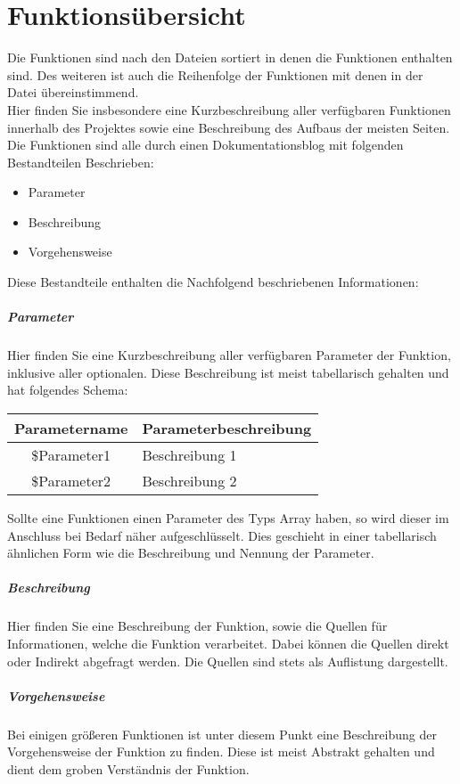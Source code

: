 \setcounter{secnumdepth}{3}
\chapter{Funktionsübersicht}
Die Funktionen sind nach den Dateien sortiert in denen die Funktionen enthalten sind. Des weiteren ist auch die Reihenfolge der Funktionen mit denen in der Datei übereinstimmend. \\
Hier finden Sie insbesondere eine Kurzbeschreibung aller verfügbaren Funktionen innerhalb des Projektes sowie eine Beschreibung des Aufbaus der meisten Seiten. Die Funktionen sind alle durch einen Dokumentationsblog mit folgenden Bestandteilen Beschrieben:
\begin{itemize}
	\item Parameter
	\item Beschreibung
	\item Vorgehensweise
\end{itemize}
Diese Bestandteile enthalten die Nachfolgend beschriebenen Informationen:
\paragraph{Parameter} Hier finden Sie eine Kurzbeschreibung aller verfügbaren Parameter der Funktion, inklusive aller optionalen. Diese Beschreibung ist meist tabellarisch gehalten und hat folgendes Schema:
\begin{table}[H]
	\begin{tabular}{|c|p{11cm}|}
		\hline
		\textbf{Parametername} & \textbf{Parameterbeschreibung} \\ \hline
		\$Parameter1 & Beschreibung 1 \\ \hline
		\$Parameter2 & Beschreibung 2 \\ \hline
	\end{tabular}
\end{table}
Sollte eine Funktionen einen Parameter des Typs Array haben, so wird dieser im Anschluss bei Bedarf näher aufgeschlüsselt. Dies geschieht in einer tabellarisch ähnlichen Form wie die Beschreibung und Nennung der Parameter.
\paragraph{Beschreibung} Hier finden Sie eine Beschreibung der Funktion, sowie die Quellen für Informationen, welche die Funktion verarbeitet. Dabei können die Quellen direkt oder Indirekt abgefragt werden. Die Quellen sind stets als Auflistung dargestellt.
\paragraph{Vorgehensweise} Bei einigen größeren Funktionen ist unter diesem Punkt eine Beschreibung der Vorgehensweise der Funktion zu finden. Diese ist meist Abstrakt gehalten und dient dem groben Verständnis der Funktion.
\newpage
